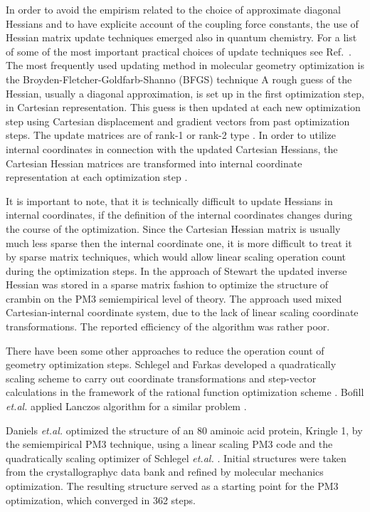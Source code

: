 \documentclass[prl,twocolumn,showpacs,twocolumngrid,superbib]{revtex4}
\begin{document}
In order to avoid the empirism related to the choice of approximate diagonal
Hessians and to have explicite account of the
coupling force constants, the use of Hessian matrix update techniques
\cite{RFletcher} emerged also in quantum chemistry. For a list
of some of the most important practical choices of update
techniques see Ref.~\cite{bakken}. 
The most frequently used updating method in molecular geometry optimization
is the Broyden-Fletcher-Goldfarb-Shanno (BFGS) technique \cite{RFletcher}
A rough guess of the Hessian, usually a
diagonal approximation, is set up in the first optimization step, in Cartesian
representation. This guess is then updated at each new optimization step
using Cartesian displacement and gradient vectors from past optimization steps.
The update matrices are of rank-1 or rank-2 type \cite{RFletcher}. 
In order to utilize internal coordinates in connection with the updated
Cartesian Hessians, the Cartesian Hessian matrices are transformed into
internal coordinate representation at each optimization step \cite{bakken}.

It is important to note, that it is technically difficult to 
update Hessians in internal coordinates, if the definition of 
the internal coordinates changes during the course of the optimization. 
Since the Cartesian Hessian matrix is usually much less sparse then the 
internal coordinate one, it is more difficult to treat it by sparse matrix 
techniques, which would allow linear scaling operation count during the
optimization steps. In the approach of Stewart \cite{Stewart_crambin_opt}
the updated inverse Hessian was stored in a sparse matrix fashion to
optimize the structure of crambin on the PM3 semiempirical level of theory. 
The approach used mixed Cartesian-internal
coordinate system, due to the lack of linear scaling coordinate transformations.
The reported efficiency of the algorithm was rather poor.

There have been some other approaches to reduce the operation
count of geometry optimization steps. Schlegel and Farkas developed
a quadratically scaling scheme to carry out coordinate transformations
and step-vector calculations in the framework of the rational function 
optimization scheme \cite{schlegel_on2iter}. Bofill {\it et.al.} 
applied Lanczos algorithm for a similar problem \cite{bofill_lanczos}.

Daniels {\it et.al.} \cite{Schlegel_plasminogen_opt} optimized the
structure of an 80 aminoic acid protein, Kringle 1, by the semiempirical 
PM3 technique, using a linear scaling PM3 code and the quadratically scaling
optimizer of Schlegel {\it et.al.} \cite{schlegel_on2iter}. 
Initial structures were taken from the crystallographyc data bank and
refined by molecular mechanics optimization. The resulting structure 
served as a starting point for the PM3 optimization, which converged in 
362 steps.
\end{document}
